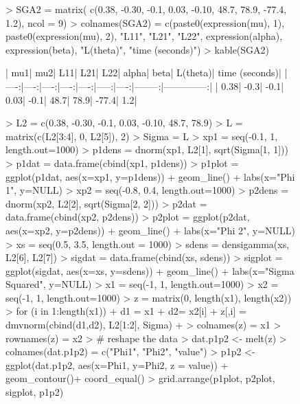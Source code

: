 \documentclass{article}
\begin{document}
\begin{figure}
\begin{Schunk}
\begin{Sinput}
> SGA2 = matrix( c(0.38, -0.30, -0.1, 0.03, -0.10, 48.7, 78.9, -77.4, 1.2), ncol = 9)
> colnames(SGA2) = c(paste0(expression(mu), 1), paste0(expression(mu), 2), "L11", "L21", "L22", expression(alpha), expression(beta), "L(theta)", "time (seconds)")
> kable(SGA2)
\end{Sinput}
\begin{Soutput}
|  mu1|  mu2|  L11|  L21|  L22| alpha| beta| L(theta)| time (seconds)|
|----:|----:|----:|----:|----:|-----:|----:|--------:|--------------:|
| 0.38| -0.3| -0.1| 0.03| -0.1|  48.7| 78.9|    -77.4|            1.2|
\end{Soutput}
\begin{Sinput}
> L2 =  c(0.38, -0.30, -0.1, 0.03, -0.10, 48.7, 78.9)
> L = matrix(c(L2[3:4], 0, L2[5]), 2)
> Sigma = L %*% t(L)
> xp1 = seq(-0.1, 1, length.out=1000)
> p1dens = dnorm(xp1, L2[1], sqrt(Sigma[1, 1]))
> p1dat = data.frame(cbind(xp1, p1dens))
> p1plot = ggplot(p1dat, aes(x=xp1, y=p1dens)) + geom_line() + labs(x="Phi 1", y=NULL)
> xp2 = seq(-0.8, 0.4, length.out=1000)
> p2dens = dnorm(xp2, L2[2], sqrt(Sigma[2, 2]))
> p2dat = data.frame(cbind(xp2, p2dens))
> p2plot = ggplot(p2dat, aes(x=xp2, y=p2dens)) + geom_line() + labs(x="Phi 2", y=NULL)
> xs = seq(0.5, 3.5, length.out = 1000)
> sdens = densigamma(xs, L2[6], L2[7])
> sigdat = data.frame(cbind(xs, sdens))
> sigplot = ggplot(sigdat, aes(x=xs, y=sdens)) + geom_line() + labs(x="Sigma Squared", y=NULL)
> x1 = seq(-1, 1, length.out=1000)
> x2 = seq(-1, 1, length.out=1000)
> z = matrix(0, length(x1), length(x2))
> for (i in 1:length(x1)) {
+   d1 = x1
+   d2= x2[i]
+   z[,i] = dmvnorm(cbind(d1,d2), L2[1:2], Sigma)
+ }
> colnames(z) = x1
> rownames(z) = x2
> # reshape the data
> dat.p1p2 <- melt(z)
> colnames(dat.p1p2) = c("Phi1", "Phi2", "value")
> p1p2 <- ggplot(dat.p1p2, aes(x=Phi1, y=Phi2, z = value)) + geom_contour()+ coord_equal()
> grid.arrange(p1plot, p2plot, sigplot, p1p2)
\end{Sinput}
\end{Schunk}
\end{figure}
\end{document}
